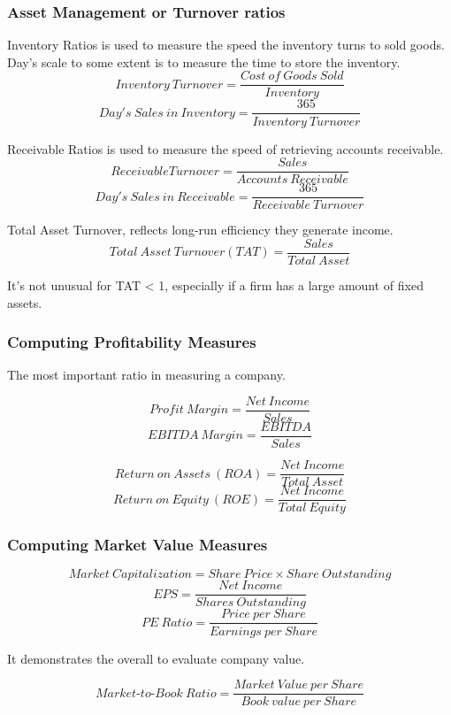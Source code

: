 \documentclass[10pt, a4paper]{article}
\begin{document}
        \subsubsection{Asset Management or Turnover  ratios}
        
        Inventory Ratios is used to measure the speed the inventory turns to sold goods. Day's scale to some extent is to measure the time to store the inventory.
            $$Inventory\ Turnover = \frac{Cost\ of\ Goods\ Sold}{Inventory}$$
            $$Day's\ Sales\ in\ Inventory = \frac{365}{Inventory\ Turnover}$$
        
        Receivable Ratios is used to measure the speed of retrieving accounts receivable.
            $$Receivable Turnover = \frac{Sales}{Accounts\ Receivable}$$
            $$Day's\ Sales\ in\ Receivable = \frac{365}{Receivable\ Turnover}$$

        Total Asset Turnover, reflects long-run efficiency they generate income. 
            $$Total\ Asset\ Turnover(TAT) = \frac{Sales}{Total\ Asset}$$

            It's not unusual for TAT < 1, especially if a firm has a large amount of fixed assets.  
        \subsubsection{Computing Profitability Measures}    
            The most important ratio in measuring a company.

            $$Profit\ Margin = \frac{Net\ Income}{Sales}$$
            $$EBITDA\ Margin = \frac{EBITDA}{Sales}$$
            
            

            $$Return\ on\ Assets\ (ROA) = \frac{Net\ Income}{Total\ Asset}$$
            $$Return\ on\ Equity\ (ROE) = \frac{Net\ Income}{Total\ Equity}$$
        \subsubsection{Computing Market Value Measures}
            $$Market\ Capitalization = Share\ Price \times Share\ Outstanding$$
            $$EPS = \frac{Net\ Income}{Shares\ Outstanding}$$
            $$PE\ Ratio = \frac{Price\ per\ Share}{Earnings\ per\ Share}$$

            It demonstrates the overall to evaluate company value. 

            $$Market\text{-}to\text{-}Book\ Ratio = \frac{Market\ Value\ per\ Share}
            {Book\ value\ per\ Share}$$
\end{document}
